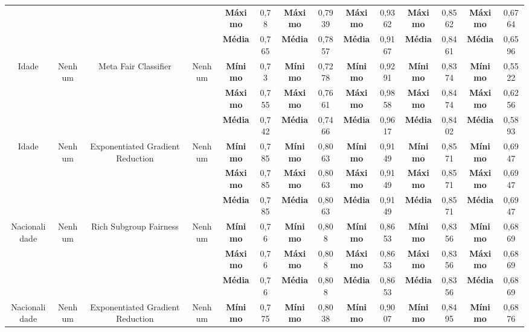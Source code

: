 \documentclass[Portugues,Final]{ic-tese-v3}
\begin{document}
\begin{table}[H]
\begin{center}
{\begin{tabular}{c|c|c|c|c|c|c|c|c|c|c|c|c|c}
             & & & & \textbf{Máximo} & 0,78 & \textbf{Máximo} & 0,7939 & \textbf{Máximo} & 0,9362 & \textbf{Máximo} & 0,8562 & \textbf{Máximo} & 0,6764 \\
             & & & & \textbf{Média} & 0,765 & \textbf{Média} & 0,7857 & \textbf{Média} & 0,9167 & \textbf{Média} & 0,8461 & \textbf{Média} & 0,6596 \\
            \hline
            \multirow{3}{*}{Idade} & \multirow{3}{*}{Nenhum} & \multirow{3}{*}{Meta Fair Classifier} & \multirow{3}{*}{Nenhum} & \textbf{Mínimo} & 0,73 & \textbf{Mínimo} & 0,7278 & \textbf{Mínimo} & 0,9291 & \textbf{Mínimo} & 0,8374 & \textbf{Mínimo} & 0,5522 \\
             & & & & \textbf{Máximo} & 0,755 & \textbf{Máximo} & 0,7661 & \textbf{Máximo} & 0,9858 & \textbf{Máximo} & 0,8474 & \textbf{Máximo} & 0,6256 \\
             & & & & \textbf{Média} & 0,742 & \textbf{Média} & 0,7466 & \textbf{Média} & 0,9617 & \textbf{Média} & 0,8402 & \textbf{Média} & 0,5893 \\
            \hline
            \multirow{3}{*}{Idade} & \multirow{3}{*}{Nenhum} & \multirow{3}{*}{Exponentiated Gradient Reduction} & \multirow{3}{*}{Nenhum} & \textbf{Mínimo} & 0,785 & \textbf{Mínimo} & 0,8063 & \textbf{Mínimo} & 0,9149 & \textbf{Mínimo} & 0,8571 & \textbf{Mínimo} & 0,6947 \\
             & & & & \textbf{Máximo} & 0,785 & \textbf{Máximo} & 0,8063 & \textbf{Máximo} & 0,9149 & \textbf{Máximo} & 0,8571 & \textbf{Máximo} & 0,6947 \\
             & & & & \textbf{Média} & 0,785 & \textbf{Média} & 0,8063 & \textbf{Média} & 0,9149 & \textbf{Média} & 0,8571 & \textbf{Média} & 0,6947 \\
            \hline
            \multirow{3}{*}{Nacionalidade} & \multirow{3}{*}{Nenhum} & \multirow{3}{*}{Rich Subgroup Fairness} & \multirow{3}{*}{Nenhum} & \textbf{Mínimo} & 0,76 & \textbf{Mínimo} & 0,808 & \textbf{Mínimo} & 0,8653 & \textbf{Mínimo} & 0,8356 & \textbf{Mínimo} & 0,6869 \\
             & & & & \textbf{Máximo} & 0,76 & \textbf{Máximo} & 0,808 & \textbf{Máximo} & 0,8653 & \textbf{Máximo} & 0,8356 & \textbf{Máximo} & 0,6869 \\
             & & & & \textbf{Média} & 0,76 & \textbf{Média} & 0,808 & \textbf{Média} & 0,8653 & \textbf{Média} & 0,8356 & \textbf{Média} & 0,6869 \\
            \hline
            \multirow{3}{*}{Nacionalidade} & \multirow{3}{*}{Nenhum} & \multirow{3}{*}{Exponentiated Gradient Reduction} & \multirow{3}{*}{Nenhum} & \textbf{Mínimo} & 0,775 & \textbf{Mínimo} & 0,8038 & \textbf{Mínimo} & 0,9007 & \textbf{Mínimo} & 0,8495 & \textbf{Mínimo} & 0,6876 \\

\end{tabular}}
\end{center}
\end{table}
\end{document}
